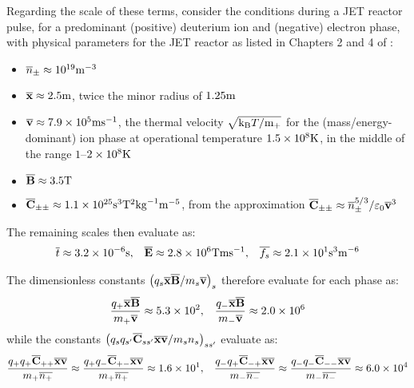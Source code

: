     Regarding the scale of these terms, consider the conditions during a JET reactor pulse, for a predominant (positive) deuterium  ion and (negative) electron phase, with physical parameters for the JET reactor as listed in Chapters 2 and 4 of \cite{Wes00}:
    \begin{itemize}
        \item  $\overline{n}_{\pm}  \approx  10^{19}\mathrm{m}^{- 3}$
        \item  $\overline{\mathbf{x}}  \approx  2.5\mathrm{m}$, twice the minor radius of $1.25\mathrm{m}$
        \item  $\overline{\mathbf{v}}  \approx  7.9\times 10^{5}\mathrm{m}\mathrm{s}^{- 1}$, the thermal velocity $\sqrt{\mathrm{k}_{\mathrm{B}}T/\mathrm{m}_{+}}$ for the (mass/energy-dominant) ion phase at operational temperature $1.5\times 10^{8}\mathrm{K}$, in the middle of the range $1$–$2\times 10^{8}\mathrm{K}$
        \item  $\overline{\mathbf{B}}  \approx  3.5\mathrm{T}$
        \item  $\overline{\mathbf{C}}_{\pm\pm}  \approx  1.1\times 10^{25}\mathrm{s}^{3}\mathrm{T}^{2}{\rm kg}^{- 1}\mathrm{m}^{- 5}$, from the approximation $\overline{\mathbf{C}}_{\pm\pm}  \approx  \overline{n}_{\pm}^{5/3}/\varepsilon_{0}\overline{\mathbf{v}}^{3}$ 
    \end{itemize}
    The remaining scales then evaluate as:
    \begin{align}
        \overline{t}      \approx  3.2\times 10^{- 6}\mathrm{s},  &&
        \overline{\mathbf{E}}   \approx  2.8\times 10^{6}\mathrm{T}\mathrm{m}\mathrm{s}^{- 1},  &&
        \overline{f_{s}}  \approx  2.1\times 10^{1}\mathrm{s}^{3}\mathrm{m}^{- 6}
    \end{align}
    
    
    The dimensionless constants $\left(q_{s}\overline{\mathbf{x}}\overline{\mathbf{B}}/m_{s}\overline{\mathbf{v}}\right)_{s}$ therefore evaluate for each phase as:
    \begin{align}
        \frac{q_{+}\overline{\mathbf{x}}\overline{\mathbf{B}}}{m_{+}\overline{\mathbf{v}}}  \approx  5.3\times 10^{2},  &&
        \frac{q_{-}\overline{\mathbf{x}}\overline{\mathbf{B}}}{m_{-}\overline{\mathbf{v}}}  \approx  2.0\times 10^{6}
    \end{align}
    while the constants $\left(q_{s}q_{s'}\overline{\mathbf{C}}_{ss'}\overline{\mathbf{x}}\overline{\mathbf{v}}/m_{s}n_{s}\right)_{ss'}$ evaluate as:
    \begin{align}
        \frac{q_{+}q_{+}\overline{\mathbf{C}}_{++}\overline{\mathbf{x}}\overline{\mathbf{v}}}{m_{+}\overline{n_{+}}}  \approx  \frac{q_{+}q_{-}\overline{\mathbf{C}}_{+-}\overline{\mathbf{x}}\overline{\mathbf{v}}}{m_{+}\overline{n_{+}}}  \approx  1.6\times 10^{1},  &&
        \frac{q_{-}q_{+}\overline{\mathbf{C}}_{-+}\overline{\mathbf{x}}\overline{\mathbf{v}}}{m_{-}\overline{n_{-}}}  \approx \frac{q_{-}q_{-}\overline{\mathbf{C}}_{--}\overline{\mathbf{x}}\overline{\mathbf{v}}}{m_{-}\overline{n_{-}}}  \approx   6.0\times 10^{4}
    \end{align}
    
